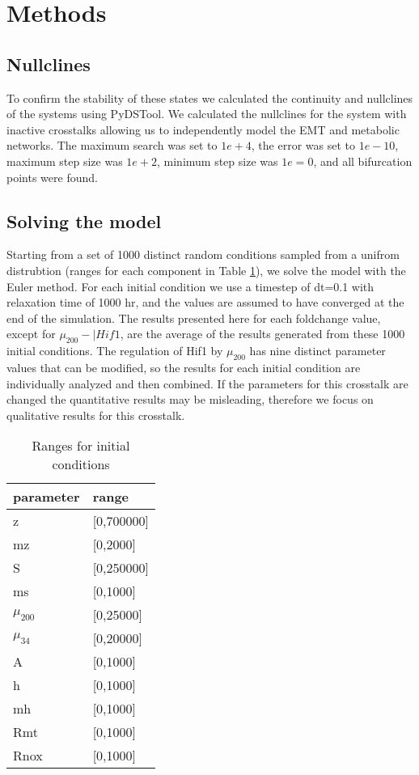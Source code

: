 \documentclass{article}
\begin{document}

\section{Methods}



\subsection{Nullclines}
To confirm the stability of these states we calculated the continuity and nullclines of the systems using PyDSTool\cite{Pydstool}.  
We calculated the nullclines for the system with inactive crosstalks allowing us to independently model the EMT and metabolic networks. The maximum search was set to $1e+4$, the error was set to $1e-10$, maximum step size was  $1e+2$, minimum step size was $1e=0$, and all bifurcation points were found.

\subsection{Solving the model}
Starting from a set of 1000 distinct random conditions sampled from a unifrom distrubtion (ranges for each component in Table \ref{table:ranges}), we solve the model with the Euler method.
For each initial condition we use a timestep of dt=0.1 with relaxation time of 1000 hr, and the values are assumed to have converged at the end of the simulation. 
The results presented here for each foldchange value, except for $\mu_{200}-| Hif1$, are the average of the results generated from these 1000 initial conditions. 
The regulation of Hif1 by $\mu_{200}$ has nine distinct parameter values that can be modified, so the results for each initial condition are individually analyzed and then combined. 
If the parameters for this crosstalk are changed the quantitative results may be misleading, therefore we focus on qualitative results for this crosstalk. 


\begin{table}[]
\begin{tabular}{l|l}
parameter&range\\
\hline
z & [0,700000]\\
mz & [0,2000]\\
S & [0,250000]\\
ms & [0,1000]\\
$\mu_{200}$ & [0,25000]\\
$\mu_{34}$ & [0,20000]\\
A & [0,1000]\\
h & [0,1000]\\
mh & [0,1000]\\
Rmt & [0,1000]\\
Rnox & [0,1000]\\
\hline
\end{tabular}
\caption{Ranges for initial conditions}
\label{table:ranges}
\end{table}
\end{document}
